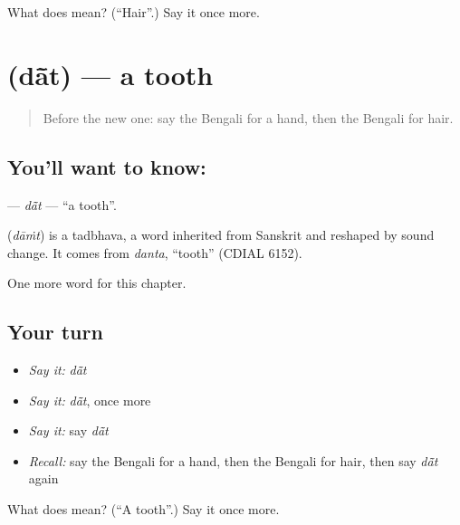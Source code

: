 \begin{tcolorbox}[breakable,colback=teal!4,colframe=teal!35!black,title={Before you move on}]
What does  mean? (\textquotedblleft{}Hair\textquotedblright{}.) Say it once more.
\end{tcolorbox}
\section[\texorpdfstring{\bn{দাঁত} (dā̃t)}{দাঁত (dā̃t)}]{ (dā̃t) — a tooth}

\label{lesson:BN-C42-dat}



\begin{quote}
Before the new one: say the Bengali for a hand, then the Bengali for hair.
\end{quote}

\subsection*{You'll want to know: }
\textbf{} — \emph{dā̃t} — \textquotedblleft{}a tooth\textquotedblright{}.

\begin{cousinweb}
\textbf{} (\emph{dāṁt}) is a tadbhava, a word inherited from Sanskrit and reshaped by sound change. It comes from \emph{danta}, \textquotedblleft{}tooth\textquotedblright{} (CDIAL 6152).
\end{cousinweb}

\begin{grammarlens}[title={What you've built}]
One more word for this chapter.
\end{grammarlens}

\subsection*{Your turn}
\begin{itemize}
\raggedright
  \item \emph{Say it:} \emph{dā̃t}
  \item \emph{Say it:} \emph{dā̃t}, once more
  \item \emph{Say it:} say \emph{dā̃t}
  \item \emph{Recall:} say the Bengali for a hand, then the Bengali for hair, then say \emph{dā̃t} again
\end{itemize}

\begin{tcolorbox}[breakable,colback=teal!4,colframe=teal!35!black,title={Before you move on}]
What does  mean? (\textquotedblleft{}A tooth\textquotedblright{}.) Say it once more.
\end{tcolorbox}
